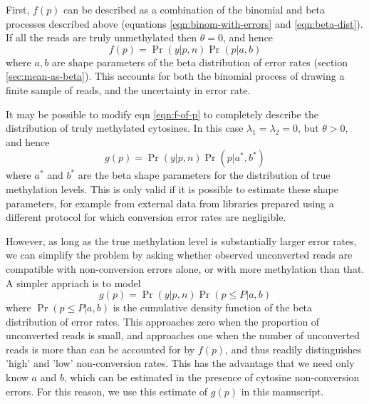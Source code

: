 \documentclass[twocolumn,twoside,lettersize]{article}
\begin{document}
First, $f(p)$ can be described as a combination of the binomial and beta processes described above (equations \ref{eqn:binom-with-errors} and \ref{eqn:beta-dist}).
If all the reads are truly unmethylated then $\theta=0$, and hence
\begin{equation}
    f(p) = \Pr(y | p, n) \Pr(p | a, b)
    \label{eqn:f-of-p}
\end{equation}
where $a, b$ are shape parameters of the beta distribution of error rates (section \ref{sec:mean-as-beta}).
This accounts for both the binomial process of drawing a finite sample of reads, and the uncertainty in error rate.

It may be possible to modify eqn \ref{eqn:f-of-p} to completely describe the distribution of truly methylated cytosines.
In this case $\lambda_1=\lambda_2=0$, but $\theta>0$, and hence
\begin{equation}
    g(p) = \Pr(y | p, n) \Pr(p | a^*,b^*)
    \label{eqn:f-of-p}
\end{equation}
where $a^*$ and $b^*$ are the beta shape parameters for the distribution of true methylation levels.
This is only valid if it is possible to estimate these shape parameters, for example from external data from libraries prepared using a different protocol for which conversion error rates are negligible.

However, as long as the true methylation level is substantially larger error rates, we can simplify the problem by asking whether observed unconverted reads are compatible with non-conversion errors alone, or with more methylation than that.
A simpler appriach is to model 
\begin{equation}
    g(p) = \Pr(y | p, n) \Pr(p \leq P | a,b)
\end{equation}
where $\Pr(p \leq P | a,b)$ is the cumulative density function of the beta distribution of error rates.
This approaches zero when the proportion of unconverted reads is small, and approaches one when the number of unconverted reads is more than can be accounted for by $f(p)$, and thus readily distinguishes 'high' and 'low' non-conversion rates.
This has the advantage that we need only know $a$ and $b$, which can be estimated in the presence of cytosine non-conversion errors.
For this reason, we use this estimate of $g(p)$ in this manuscript.
\end{document}
